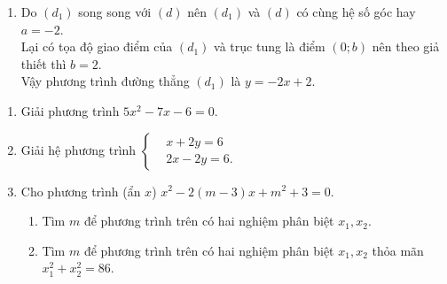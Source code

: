 \begin{ex}
{\begin{enumerate}
\begin{itemize}
		\item Với $x=1$ thì $y=1^2=1$, ta được giao điểm $A(1,1)$.
		\item Với $x=-3$ thì $y=(-3)^2=9$, ta được giao điểm $B(-3,9)$.
	\end{itemize}
	\item Do $(d_1)$ song song với $(d)$ nên $(d_1)$ và $(d)$ có cùng hệ số góc hay $a=-2$.\\
	Lại có tọa độ giao điểm của $(d_1)$ và trục tung là điểm $(0;b)$ nên theo giả thiết thì $b=2$.\\
	Vậy phương trình đường thẳng $(d_1)$ là $y=-2x+2$.
\end{enumerate}
}
\end{ex}

\begin{ex}%
	\begin{enumerate}
		\item Giải phương trình $5x^2-7x-6=0$.
		\item Giải hệ phương trình $\left\lbrace \begin{aligned} &x+2y=6\\ &2x-2y=6. \end{aligned} \right.$
		\item Cho phương trình (ẩn $x$) $x^2-2(m-3)x+m^2+3=0.$ 
		\begin{enumerate}
			\item Tìm $m$ để phương trình trên có hai nghiệm phân biệt $x_1,x_2$.
			\item Tìm $m$ để phương trình trên có hai nghiệm phân biệt $x_1,x_2$ thỏa mãn $x_1^2+x_2^2=86$.
		\end{enumerate} 
	\end{enumerate}
\end{ex}
